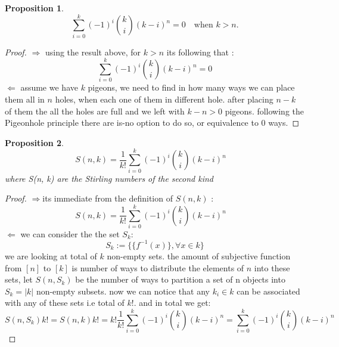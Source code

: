 \documentclass[12pt]{article}
\newtheorem{prop}{Proposition}
\begin{document}
\begin{prop}\[\sum_{i=0}^k(-1)^i {k \choose i}(k-i)^n=0 \quad \text{when } k>n.
\]
\end{prop}
\begin{proof}$\Rightarrow$  using the result  above, for $k>n$ its following that :
\[\sum_{i=0}^k(-1)^i {k \choose i}(k-i)^n=0
\]
$\Leftarrow$ assume we have $k$ pigeons, we need to find in how many ways we can place them all in $n$  holes, when each one of them in different hole.
after placing $n-k$ of them  the all the holes are full and we left with $k-n>0$ pigeons. following the  Pigeonhole principle there are is-no option to do so, or equivalence to 0 ways.
\end{proof}
\begin{prop}\[
S(n,k)=\frac{1}{k!}\sum_{i=0}^k(-1)^i {k \choose i}(k-i)^n\quad 
\]
where S(n, k) are the Stirling numbers of the second kind
\end{prop}
\begin{proof}
$\Rightarrow$its immediate from the definition of $S(n,k)$ :
\[S(n,k)=\frac{1}{k!}\sum_{i=0}^k(-1)^i {k \choose i}(k-i)^n\quad 
\]
$\Leftarrow$ we can consider the the set $S_k$:
 \[S_k:=\{\{f^{-1}(x)\},\forall x\in k \}
\]
we are looking at total of $k$ non-empty sets. the amount of subjective function from $[n]$  to $[k]$ is  number of ways to distribute the elements of $n$ into these sets, let $S(n,S_k)$ be the number of ways to partition a set of n objects into $S_k=|k|$ non-empty subsets. now we can notice that any $k_i\in k$ can be associated with any of these sets i.e total of $k!$. and in  total we get:
\[
S(n,S_k)k!=S(n,k)k!=k!\frac{1}{k!}\sum_{i=0}^k(-1)^i {k \choose i}(k-i)^n =\sum_{i=0}^k(-1)^i {k \choose i}(k-i)^n
\]
\end{proof}
\end{document}
